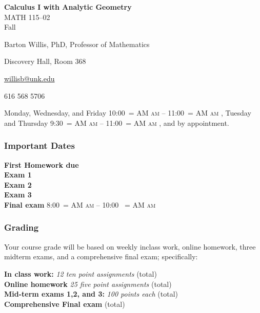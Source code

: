 \documentclass[12pt]{article}
\makeatletter
\newcounter{ex}\setcounter{ex}{0}
\newenvironment{mypar}[2]
  {\begin{list}{}%
    {\setlength\leftmargin{#1}
    \setlength\rightmargin{#2}}
    \item[]}
  {\end{list}}
\renewenvironment{description}[0]{\begin{compactdesc}}{\end{compactdesc}}
\DeclareRobustCommand{\maybefakesc}[1]{%
  \ifnum\pdfstrcmp{\f@series}{\bfdefault}=\z@
    {\fontsize{\dimexpr0.8\dimexpr\f@size pt\relax}{0}\selectfont\uppercase{#1}}%
  \else
    \textsc{#1}%
  \fi
}
\newcommand\AM{\,\maybefakesc{am}\xspace}
\newcommand{\coursename}{Calculus I with Analytic Geometry}
\newcommand{\coursenumber}{MATH 115}
\newcommand{\sectionnumber}{02}
\newcommand{\term}{Fall }
\newcommand{\officehours}{ Monday, Wednesday, and Friday 10:00\AM -- 11:00\AM,
    Tuesday and Thursday 9:30\AM -- 11:00\AM, and by appointment.}
\newcommand{\finaldateandtime}{\printdate{14/12/\the\year} 8:00\AM{} -- 10:00 \AM}
\makeatother
\begin{document}
\cleanlookdateon%
\shortdate
\printyearoff
\large
\begin{center}
    \textbf{\coursename}  \\
    {\coursenumber--\sectionnumber} \\
     {\term \the\year} \\
\end{center}

\vskip0.25in
\normalsize


\begin{center}
\begin{description}
    \item[Instructor:] Barton Willis, PhD, Professor of Mathematics
    \item[Office:]  Discovery Hall, Room 368
    \item[\phone:]   
    \item[\Email:]    \href{mailto:willisb@unk.edu}{willisb@unk.edu}
    \item[Zoom:] 616 568 5706
    \item[Office Hours:] \officehours
  \end{description}
\end{center}



\subsubsection*{Important Dates}

\begin{mypar}{0.25in}{0.25in} 

      \textbf{First Homework due} \dotfill  {}  \\
       \textbf{Exam 1} \dotfill {}  \\
    \textbf{Exam 2} \dotfill  {} \\
    \textbf{Exam 3} \dotfill {} \\
      \textbf{Final exam} \dotfill  \finaldateandtime
\end{mypar}



\subsubsection*{Grading}

Your course grade will be based on weekly inclass work, online homework, three midterm exams, and a comprehensive 
final exam; specifically:
\begin{mypar}{0.25in}{0.25in}
    \textbf{In class work:}  \emph{12 ten point assignments}   (total) \\
     \textbf{Online homework} \emph{25 five point assignments } (total)\\
    \textbf{Mid-term exams 1,2, and 3:} \emph{100 points each}  (total)\\
      \textbf{Comprehensive Final exam}  (total)
\end{mypar}
\end{document}
